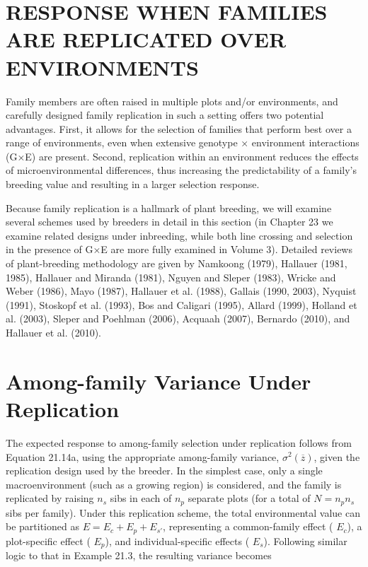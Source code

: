 \documentclass{article}
\begin{document}
\section{RESPONSE WHEN FAMILIES ARE REPLICATED OVER ENVIRONMENTS}
Family members are often raised in multiple plots and/or environments, and carefully designed family replication in such a setting offers two potential advantages. First, it allows for the selection of families that perform best over a range of environments, even when extensive genotype × environment interactions (G×E) are present. Second, replication within an environment reduces the effects of microenvironmental differences, thus increasing the predictability of a family’s breeding value and resulting in a larger selection response.

Because family replication is a hallmark of plant breeding, we will examine several schemes used by breeders in detail in this section (in Chapter 23 we examine related designs under inbreeding, while both line crossing and selection in the presence of G×E are more fully examined in Volume 3). Detailed reviews of plant-breeding methodology are given by Namkoong (1979), Hallauer (1981, 1985), Hallauer and Miranda (1981), Nguyen and Sleper (1983), Wricke and Weber (1986), Mayo (1987), Hallauer et al. (1988), Gallais (1990, 2003), Nyquist (1991), Stoskopf et al. (1993), Bos and Caligari (1995), Allard (1999), Holland et al. (2003), Sleper and Poehlman (2006), Acquaah (2007), Bernardo (2010), and Hallauer et al. (2010).

\section{Among-family Variance Under Replication}
The expected response to among-family selection under replication follows from Equation 21.14a, using the appropriate among-family variance,  $ \sigma^2(\overline{z}) $, given the replication design used by the breeder. In the simplest case, only a single macroenvironment (such as a growing region) is considered, and the family is replicated by raising  $ n_s $ sibs in each of  $ n_p $ separate plots (for a total of  $ N = n_p n_s $ sibs per family). Under this replication scheme, the total environmental value can be partitioned as  $ E = E_c + E_p + E_{s'} $, representing a common-family effect ( $ E_c $), a plot-specific effect ( $ E_p $), and individual-specific effects ( $ E_s $). Following similar logic to that in Example 21.3, the resulting variance becomes
\end{document}
